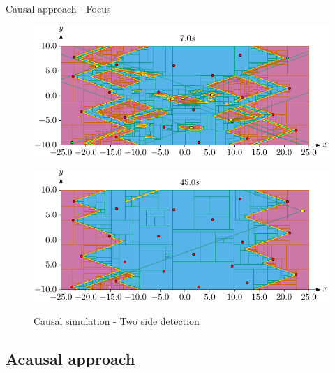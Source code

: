 \documentclass{beamer}
\begin{document}
            \begin{frame}{Causal approach - Focus}
                \begin{figure}
                    \centering
                    \begin{overprint}
                        \href{run:focus_1.mp4?loop}{\includegraphics[width=\textwidth]{imgs/focus_1}}
                            \caption{Causal simulation - Outliers}

                        \href{run:focus_2.mp4?loop}{\includegraphics[width=\textwidth]{imgs/focus_2}}
                            \caption{Causal simulation - Two side detection}
                    \end{overprint}
                \end{figure}
            \end{frame}

        \subsection{Acausal approach}
\end{document}
